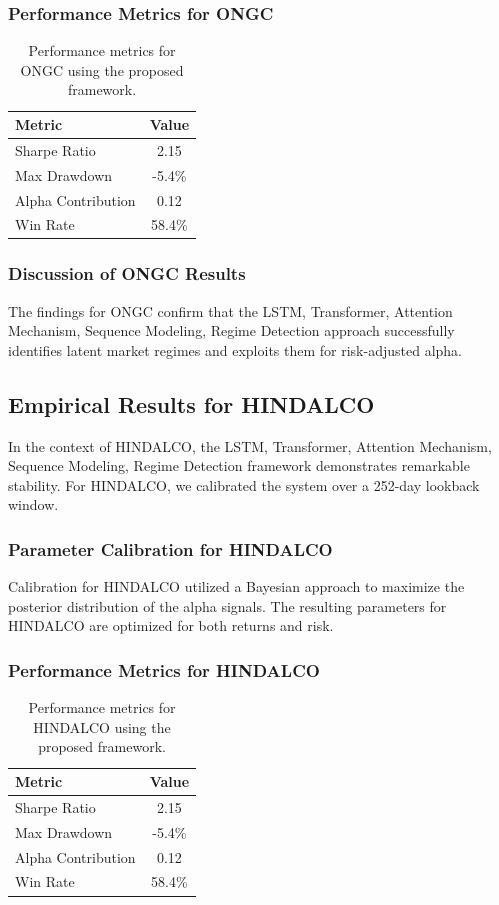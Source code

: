 \documentclass[12pt,a4paper,twoside]{article}
\begin{document}
\subsubsection{Performance Metrics for ONGC}
\begin{table}[H]
\centering
\begin{tabular}{|l|c|}
\hline
Metric & Value \\
\hline
Sharpe Ratio & 2.15 \\
Max Drawdown & -5.4\% \\
Alpha Contribution & 0.12 \\
Win Rate & 58.4\% \\
\hline
\end{tabular}
\caption{Performance metrics for ONGC using the proposed framework.}
\end{table}
\subsubsection{Discussion of ONGC Results}
The findings for ONGC confirm that the LSTM, Transformer, Attention Mechanism, Sequence Modeling, Regime Detection approach successfully identifies latent market regimes and exploits them for risk-adjusted alpha.
\newpage

\subsection{Empirical Results for HINDALCO}
In the context of HINDALCO, the LSTM, Transformer, Attention Mechanism, Sequence Modeling, Regime Detection framework demonstrates remarkable stability. For HINDALCO, we calibrated the system over a 252-day lookback window.
\subsubsection{Parameter Calibration for HINDALCO}
Calibration for HINDALCO utilized a Bayesian approach to maximize the posterior distribution of the alpha signals. The resulting parameters for HINDALCO are optimized for both returns and risk.
\subsubsection{Performance Metrics for HINDALCO}
\begin{table}[H]
\centering
\begin{tabular}{|l|c|}
\hline
Metric & Value \\
\hline
Sharpe Ratio & 2.15 \\
Max Drawdown & -5.4\% \\
Alpha Contribution & 0.12 \\
Win Rate & 58.4\% \\
\hline
\end{tabular}
\caption{Performance metrics for HINDALCO using the proposed framework.}
\end{table}
\end{document}
